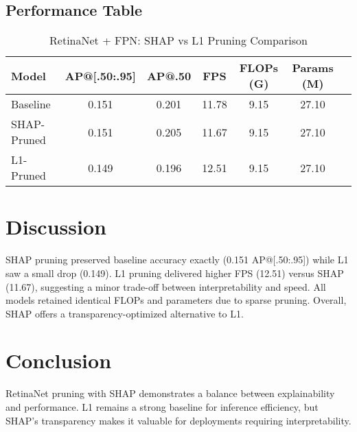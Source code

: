 \documentclass[11pt]{article}
\begin{document}
\subsection*{Performance Table}
\begin{table}[H]
\centering
\begin{tabular}{lcccccc}
\toprule
\textbf{Model} & \textbf{AP@[.50:.95]} & \textbf{AP@.50} & \textbf{FPS} & \textbf{FLOPs (G)} & \textbf{Params (M)} \\
\midrule
Baseline       & 0.151 & 0.201 & 11.78 & 9.15 & 27.10 \\
SHAP-Pruned    & 0.151 & 0.205 & 11.67 & 9.15 & 27.10 \\
L1-Pruned      & 0.149 & 0.196 & 12.51 & 9.15 & 27.10 \\
\bottomrule
\end{tabular}
\caption{RetinaNet + FPN: SHAP vs L1 Pruning Comparison}
\end{table}

\section{Discussion}
SHAP pruning preserved baseline accuracy exactly (0.151 AP@[.50:.95]) while L1 saw a small drop (0.149). L1 pruning delivered higher FPS (12.51) versus SHAP (11.67), suggesting a minor trade-off between interpretability and speed. All models retained identical FLOPs and parameters due to sparse pruning. Overall, SHAP offers a transparency-optimized alternative to L1.

\section*{Conclusion}
RetinaNet pruning with SHAP demonstrates a balance between explainability and performance. L1 remains a strong baseline for inference efficiency, but SHAP’s transparency makes it valuable for deployments requiring interpretability.
\end{document}
